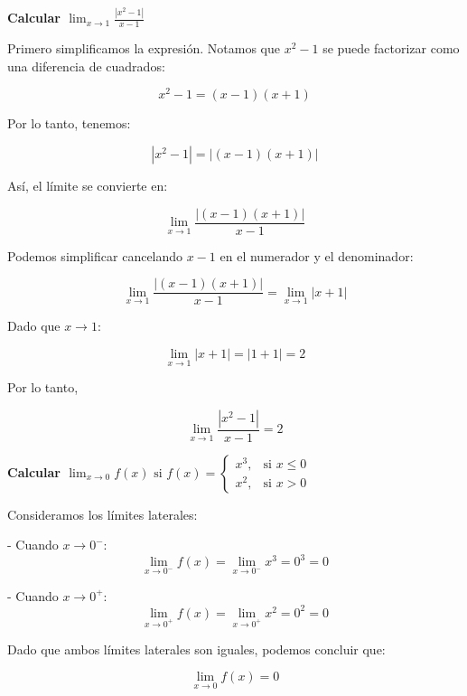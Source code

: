 \documentclass[answers]{exam} %
\begin{document}
\begin{questions}
	\question \large\textbf{Calcular $\displaystyle \lim_{x\to{1}} \frac{|x^2-1|}{x-1}$}
	\begin{solution}
		Primero simplificamos la expresión. Notamos que \(x^2 - 1\) se puede factorizar como una diferencia de cuadrados:

		\[
			x^2 - 1 = (x - 1)(x + 1)
		\]

		Por lo tanto, tenemos:

		\[
			|x^2 - 1| = |(x - 1)(x + 1)|
		\]

		Así, el límite se convierte en:

		\[
			\lim_{x\to{1}} \frac{|(x - 1)(x + 1)|}{x - 1}
		\]

		\vspace{1cm}

		Podemos simplificar cancelando \(x - 1\) en el numerador y el denominador:

		\[
			\lim_{x\to{1}} \frac{|(x - 1)(x + 1)|}{x - 1} = \lim_{x\to{1}} |x + 1|
		\]

		Dado que \(x \to 1\):

		\[
			\lim_{x\to{1}} |x + 1| = |1 + 1| = 2
		\]

		Por lo tanto,

		\[
			\lim_{x\to{1}} \frac{|x^2-1|}{x-1} = 2
		\]
	\end{solution}


	\vspace{0.5cm}
	\newpage

	\question \large\textbf{Calcular $\displaystyle \lim_{x\to{0}} f(x) \text{ si } f(x) =
			\begin{cases}
				x^3, & \text{si } x \leq 0 \\
				x^2, & \text{si } x > 0
			\end{cases}$}
	\begin{solution}
		Consideramos los límites laterales:

		- Cuando \( x \to 0^- \):
		\[
			\lim_{x \to 0^-} f(x) = \lim_{x \to 0^-} x^3 = 0^3 = 0
		\]

		- Cuando \( x \to 0^+ \):
		\[
			\lim_{x \to 0^+} f(x) = \lim_{x \to 0^+} x^2 = 0^2 = 0
		\]

		Dado que ambos límites laterales son iguales, podemos concluir que:

		\[
			\lim_{x \to 0} f(x) = 0
		\]
	\end{solution}


	\vspace{0.5cm}


\end{questions}
\end{document}
